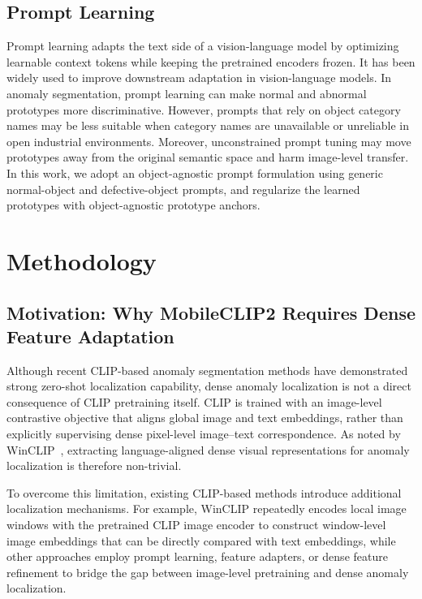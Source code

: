 \documentclass[10pt]{article}
\begin{document}
\subsection{Prompt Learning}
Prompt learning adapts the text side of a vision-language model by optimizing learnable context tokens while keeping the pretrained encoders frozen. It has been widely used to improve downstream adaptation in vision-language models. In anomaly segmentation, prompt learning can make normal and abnormal prototypes more discriminative. However, prompts that rely on object category names may be less suitable when category names are unavailable or unreliable in open industrial environments. Moreover, unconstrained prompt tuning may move prototypes away from the original semantic space and harm image-level transfer. In this work, we adopt an object-agnostic prompt formulation using generic normal-object and defective-object prompts, and regularize the learned prototypes with object-agnostic prototype anchors.

\section{Methodology}

\subsection{Motivation: Why MobileCLIP2 Requires Dense Feature Adaptation}

Although recent CLIP-based anomaly segmentation methods have demonstrated strong zero-shot localization capability, dense anomaly localization is not a direct consequence of CLIP pretraining itself. CLIP is trained with an image-level contrastive objective that aligns global image and text embeddings, rather than explicitly supervising dense pixel-level image--text correspondence. As noted by WinCLIP~\cite{winclip}, extracting language-aligned dense visual representations for anomaly localization is therefore non-trivial.

To overcome this limitation, existing CLIP-based methods introduce additional localization mechanisms. For example, WinCLIP repeatedly encodes local image windows with the pretrained CLIP image encoder to construct window-level image embeddings that can be directly compared with text embeddings, while other approaches employ prompt learning, feature adapters, or dense feature refinement to bridge the gap between image-level pretraining and dense anomaly localization.
\end{document}
